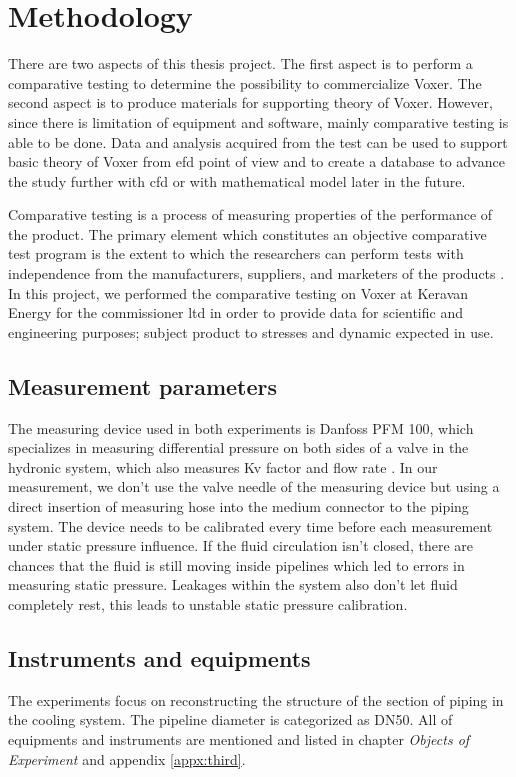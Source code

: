 
\chapter{Methodology}

There are two aspects of this thesis project. The first aspect is to perform a comparative testing to determine the possibility to commercialize Voxer. The second aspect is to produce materials for supporting theory of Voxer. However, since there is limitation of equipment and software, mainly comparative testing is able to be done. Data and analysis acquired from the test can be used to support basic theory of Voxer from \gls{efd} point of view \cite{springer:book}and to create a database to advance the study further with \gls{cfd} or with mathematical model later in the future.

Comparative testing is a process of measuring properties of the performance of the product. The primary element which constitutes an objective comparative test program is the extent to which the researchers can perform tests with independence from the manufacturers, suppliers, and marketers of the products \cite{test:book}. In this project, we performed the comparative testing on Voxer at Keravan Energy for the commissioner \gls{ltd} in order to provide data for scientific and engineering purposes; subject product to stresses and dynamic expected in use. 

\section{Measurement parameters}

The measuring device used in both experiments is Danfoss PFM 100, which specializes in measuring differential pressure on both sides of a valve in the hydronic system, which also measures Kv factor and flow rate \cite{danfoss:web}. In our measurement, we don't use the valve needle of the measuring device but using a direct insertion of measuring hose into the medium connector to the piping system. The device needs to be calibrated every time before each measurement under static pressure influence. If the fluid circulation isn't closed, there are chances that the fluid is still moving inside pipelines which led to errors in measuring static pressure. Leakages within the system also don't let fluid completely rest, this leads to unstable static pressure calibration.
  
\section{Instruments and equipments}
The experiments focus on reconstructing the structure of the section of piping in the cooling system. The pipeline diameter is categorized as DN50. 
All of equipments and instruments are mentioned and listed in chapter \textit{Objects of Experiment} and appendix \ref{appx:third}.

